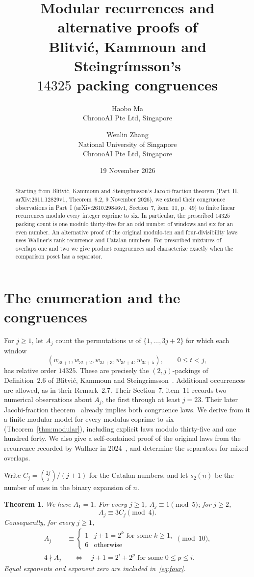 \documentclass[11pt]{article}
\title{Modular recurrences and alternative proofs of\\
Blitvi\'c, Kammoun and Steingr\'imsson's\\$14325$ packing congruences}
\author{Haobo Ma\\\small ChronoAI Pte Ltd, Singapore
\and Wenlin Zhang\\\small National University of Singapore\\
\small ChronoAI Pte Ltd, Singapore}
\date{19 November 2026}
\newtheorem{theorem}{Theorem}
\begin{document}
\maketitle
\begin{abstract}
Starting from Blitvi\'c, Kammoun and Steingr\'imsson's Jacobi-fraction
theorem (Part~II, arXiv:2611.12829v1, Theorem~9.2, 9 November 2026),
we extend their congruence observations in Part~I (arXiv:2610.29846v1,
Section~7, item~11, p.~49) to finite linear recurrences modulo every
integer coprime to six.
In particular, the prescribed $14325$ packing count is one modulo
thirty-five for an odd number of windows and six for an even number.
An alternative proof of the original modulo-ten and four-divisibility
laws uses Wallner's rank recurrence and Catalan numbers.
For prescribed mixtures of overlaps one and two we give product
congruences and characterize exactly when the comparison poset has
a separator.
\end{abstract}

\section{The enumeration and the congruences}
For $j\geq1$, let $A_j$ count the permutations $w$ of
$\{1,\ldots,3j+2\}$ for which each window
\[
 (w_{3t+1},w_{3t+2},w_{3t+3},w_{3t+4},w_{3t+5}),
 \qquad 0\leq t<j,
\]
has relative order $14325$. These are precisely the $(2,j)$-packings
of Definition~2.6 of Blitvi\'c, Kammoun and Steingr\'imsson~\cite{BKS}.
Additional occurrences are allowed, as in their Remark~2.7.
Their Section~7, item~11 records two numerical observations about $A_j$,
the first through at least $j=23$. Their later Jacobi-fraction
theorem~\cite[Theorem~9.2]{BKSII} already implies both congruence
laws. We derive from it a finite modular model for every modulus
coprime to six (Theorem~\ref{thm:modular}), including explicit laws
modulo thirty-five and one hundred forty. We also give a self-contained
proof of the original laws from the recurrence recorded by Wallner
in 2024~\cite{OEIS}, and determine the separators for mixed overlaps.

Write $C_j=\binom{2j}{j}/(j+1)$ for the Catalan numbers, and let $s_2(n)$
be the number of ones in the binary expansion of $n$.
\begin{theorem}\label{thm:main}
We have $A_1=1$. For every $j\geq1$, $A_j\equiv1\pmod5$; for $j\geq2$,
\begin{equation}\label{eq:cat}
 A_j\equiv3C_j\pmod4.
\end{equation}
Consequently, for every $j\geq1$,
\begin{align}
 A_j&\equiv
 \begin{cases}1&j+1=2^k\text{ for some }k\geq1,\\
 6&\text{otherwise}\end{cases}\pmod {10},\label{eq:ten}\\
 4\nmid A_j&\quad\Longleftrightarrow\quad
 j+1=2^i+2^p\text{ for some }0\leq p\leq i.\label{eq:four}
\end{align}
Equal exponents and exponent zero are included in~\eqref{eq:four}.
\end{theorem}
\end{document}
